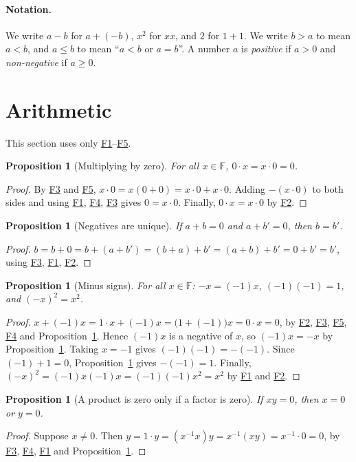 \documentclass[11pt]{article}
\newcommand{\axF}[1]{\hyperref[ax:F#1]{F#1}}
\theoremstyle{plain}
\newtheorem{proposition}[theorem]{Proposition}
\theoremstyle{definition}
\theoremstyle{remark}
\begin{document}
\paragraph{Notation.} We write $a - b$ for $a + (-b)$, $x^2$ for $x x$, and $2$ for $1 + 1$. We write $b > a$ to mean $a < b$, and $a \leq b$ to mean ``$a < b$ or $a = b$''. A number $a$ is \emph{positive} if $a > 0$ and \emph{non-negative} if $a \geq 0$.

\section{Arithmetic}

This section uses only \axF{1}--\axF{5}.

\begin{proposition}[Multiplying by zero]\label{prop:zero}
For all $x \in \mathbb{F}$, $0 \cdot x = x \cdot 0 = 0$.
\end{proposition}
\begin{proof}
By \axF{3} and \axF{5}, $x \cdot 0 = x (0 + 0) = x \cdot 0 + x \cdot 0$. Adding $-(x \cdot 0)$ to both sides and using \axF{1}, \axF{4}, \axF{3} gives $0 = x \cdot 0$. Finally, $0 \cdot x = x \cdot 0$ by \axF{2}.
\end{proof}

\begin{proposition}[Negatives are unique]\label{prop:unique}
If $a + b = 0$ and $a + b' = 0$, then $b = b'$.
\end{proposition}
\begin{proof}
$b = b + 0 = b + (a + b') = (b + a) + b' = (a + b) + b' = 0 + b' = b'$, using \axF{3}, \axF{1}, \axF{2}.
\end{proof}

\begin{proposition}[Minus signs]\label{prop:neg}
For all $x \in \mathbb{F}$: $-x = (-1)x$, $(-1)(-1) = 1$, and $(-x)^2 = x^2$.
\end{proposition}
\begin{proof}
$x + (-1)x = 1 \cdot x + (-1)x = \bigl(1 + (-1)\bigr)x = 0 \cdot x = 0$, by \axF{2}, \axF{3}, \axF{5}, \axF{4} and Proposition~\ref{prop:zero}. Hence $(-1)x$ is a negative of $x$, so $(-1)x = -x$ by Proposition~\ref{prop:unique}. Taking $x = -1$ gives $(-1)(-1) = -(-1)$. Since $(-1) + 1 = 0$, Proposition~\ref{prop:unique} gives $-(-1) = 1$. Finally, $(-x)^2 = (-1)x(-1)x = (-1)(-1)x^2 = x^2$ by \axF{1} and \axF{2}.
\end{proof}

\begin{proposition}[A product is zero only if a factor is zero]\label{prop:nzd}
If $x y = 0$, then $x = 0$ or $y = 0$.
\end{proposition}
\begin{proof}
Suppose $x \neq 0$. Then $y = 1 \cdot y = (x^{-1} x) y = x^{-1}(x y) = x^{-1} \cdot 0 = 0$, by \axF{3}, \axF{4}, \axF{1} and Proposition~\ref{prop:zero}.
\end{proof}
\end{document}
